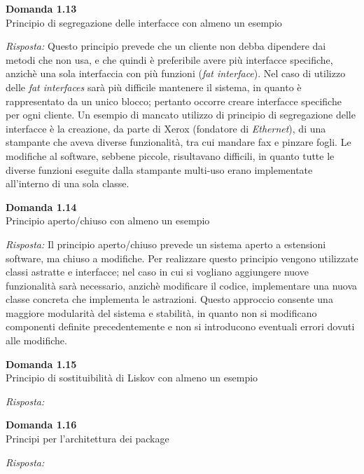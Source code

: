 \documentclass{article}
\newenvironment{problem}[2][Domanda]
    { \begin{mdframed}[backgroundcolor=gray!20] \textbf{#1 #2} \\}
    {  \end{mdframed}}
\newenvironment{solution}
    {\textit{Risposta:}}
    {}
\begin{document}
\begin{problem}{1.13}
Principio di segregazione delle interfacce con almeno un esempio
\end{problem}
\begin{solution}
Questo principio prevede che un cliente non debba dipendere dai metodi che non usa, e che quindi è preferibile avere più interfacce specifiche, anzichè una sola interfaccia con più funzioni (\textit{fat interface}).
\newline
Nel caso di utilizzo delle \textit{fat interfaces} sarà più difficile mantenere il sistema, in quanto è rappresentato da un unico blocco; pertanto occorre creare interfacce specifiche per ogni cliente.
\newline
Un esempio di mancato utilizzo di principio di segregazione delle interfacce è la creazione, da parte di Xerox (fondatore di \textit{Ethernet}), di una stampante che aveva diverse funzionalità, tra cui mandare fax e pinzare fogli. Le modifiche al software, sebbene piccole, risultavano difficili, in quanto tutte le diverse funzioni eseguite dalla stampante multi-uso erano implementate all'interno di una sola classe.
\end{solution}


\begin{problem}{1.14}
Principio aperto/chiuso con almeno un esempio
\end{problem}
\begin{solution}
Il principio aperto/chiuso prevede un sistema aperto a estensioni software, ma chiuso a modifiche.
\newline
Per realizzare questo principio vengono utilizzate classi astratte e interfacce; nel caso in cui si vogliano aggiungere nuove funzionalità sarà necessario, anzichè modificare il codice, implementare una nuova classe concreta che implementa le astrazioni.
\newline
Questo approccio consente una maggiore modularità del sistema e stabilità, in quanto non si modificano componenti definite precedentemente e non si introducono eventuali errori dovuti alle modifiche.
\end{solution}


\begin{problem}{1.15}
Principio di sostituibilità di Liskov con almeno un esempio
\end{problem}
\begin{solution}
\end{solution}


\begin{problem}{1.16}
Principi per l'architettura dei package
\end{problem}
\begin{solution}
\end{solution}
\end{document}
